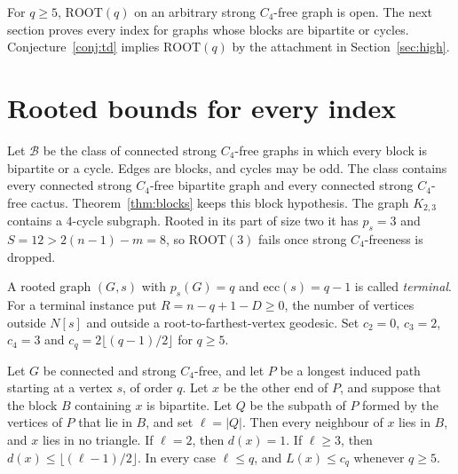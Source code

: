 \documentclass[ASNA]{USG}
\theoremstyle{WBstyletwo}
\numberwithin{equation}{section}
\newcommand{\pp}{p}
\newcommand{\ROOT}{\mathrm{ROOT}}
\begin{document}
For $q\ge 5$, $\ROOT(q)$ on an arbitrary strong $C_4$-free graph is open. The next section proves every index for graphs whose blocks are bipartite or cycles. Conjecture~\ref{conj:td} implies $\ROOT(q)$ by the attachment in Section~\ref{sec:high}.

\section{Rooted bounds for every index}\label{sec:blocks}

Let $\mathcal B$ be the class of connected strong $C_4$-free graphs in which every block is bipartite or a cycle. Edges are blocks, and cycles may be odd. The class contains every connected strong $C_4$-free bipartite graph and every connected strong $C_4$-free cactus. Theorem~\ref{thm:blocks} keeps this block hypothesis. The graph $K_{2,3}$ contains a $4$-cycle subgraph. Rooted in its part of size two it has $\pp_s=3$ and $S=12>2(n-1)-m=8$, so $\ROOT(3)$ fails once strong $C_4$-freeness is dropped.

A rooted graph $(G,s)$ with $\pp_s(G)=q$ and $\mathrm{ecc}(s)=q-1$ is called \emph{terminal}. For a terminal instance put $R=n-q+1-D\ge 0$, the number of vertices outside $N[s]$ and outside a root-to-farthest-vertex geodesic. Set $c_2=0$, $c_3=2$, $c_4=3$ and $c_q=2\lfloor(q-1)/2\rfloor$ for $q\ge 5$.

\begin{lemma}\label{lem:blockdeg}
Let $G$ be connected and strong $C_4$-free, and let $P$ be a longest induced path starting at a vertex $s$, of order $q$. Let $x$ be the other end of $P$, and suppose that the block $B$ containing $x$ is bipartite. Let $Q$ be the subpath of $P$ formed by the vertices of $P$ that lie in $B$, and set $\ell=|Q|$. Then every neighbour of $x$ lies in $B$, and $x$ lies in no triangle. If $\ell=2$, then $d(x)=1$. If $\ell\ge 3$, then $d(x)\le\lfloor(\ell-1)/2\rfloor$. In every case $\ell\le q$, and $L(x)\le c_q$ whenever $q\ge 5$.
\end{lemma}
\end{document}
